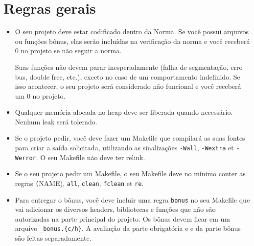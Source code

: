 
\chapter{Regras gerais}
    \begin{itemize}
      \item O seu projeto deve estar codificado dentro da Norma. Se você possui arquivos ou
        funções bônus, elas serão incluídas na verificação da norma
        e você receberá 0 no projeto se não seguir a norma.

      \itam Suas funções não devem parar inesperadamente (falha
      de segmentação, erro bus, double free, etc.), exceto no caso de um comportamento
      indefinido. Se isso acontecer, o seu projeto será considerado não funcional e você 
      receberá um 0 no projeto.

      \item Qualquer memória alocada no heap deve ser liberada quando necessário.
        Nenhum leak será tolerado.

      \item Se o projeto pedir, você deve fazer um Makefile que compilará as suas 
        fontes para criar a saída solicitada, utilizando as sinalizações \texttt{-Wall},
        \texttt{-Wextra} et \texttt{-Werror}. O seu Makefile não deve ter relink.

      \item Se o seu projeto pedir um Makefile, o seu Makefile deve no mínimo
        conter as regras \texttt(NAME), \texttt{all}, \texttt{clean},
        \texttt{fclean} et \texttt{re}.

      \item Para entregar o bônus, você deve incluir uma regra \texttt{bonus} no seu
        Makefile que vai adicionar os diversos headers, bibliotecas e funções que não são
        autorizadas na parte principal do projeto. Os bônus devem ficar em
        um arquivo \texttt{\*\_bonus.\{c/h\}}. A avaliação da parte obrigatória e
        e da parte bônus são feitas separadamente.


\end{itemize}
